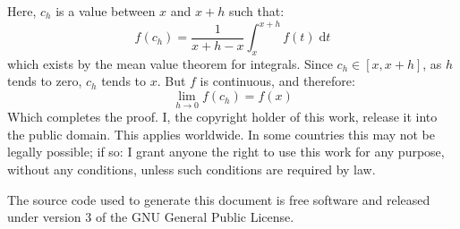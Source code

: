 \documentclass{article}
\theoremstyle{plain}
\begin{document}
    Here, $c_{h}$ is a value between $x$ and $x+h$ such that:
    \begin{equation}
        f(c_{h})=\frac{1}{x+h-x}\int_{x}^{x+h}f(t)\;\textrm{d}t
    \end{equation}
    which exists by the mean value theorem for integrals.
    Since $c_{h}\in[x,x+h]$, as $h$ tends to zero, $c_{h}$ tends to $x$.
    But $f$ is continuous, and therefore:
    \begin{equation}
        \lim_{h\rightarrow{0}}f(c_{h})=f(x)
    \end{equation}
    Which completes the proof.
    \newpage
    I, the copyright holder of this work, release it into the public domain.
    This applies worldwide. In some countries this may not be legally possible;
    if so: I grant anyone the right to use this work for any purpose, without
    any conditions, unless such conditions are required by law.
    \par\hfill\par
    The source code used to generate this document is free software and released
    under version 3 of the GNU General Public License.
\end{document}
